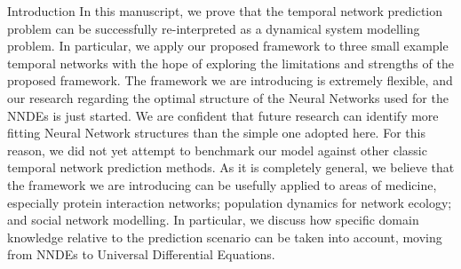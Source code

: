 \documentclass{article}
\begin{document}
\begin{section}{Introduction}
In this manuscript, we prove that the temporal network prediction problem can be successfully re-interpreted as a dynamical system modelling problem. In particular, we apply our proposed framework to three small example temporal networks with the hope of exploring the limitations and strengths of the proposed framework.
The framework we are introducing is extremely flexible, and our research regarding the optimal structure of the Neural Networks used for the NNDEs is just started.
We are confident that future research can identify more fitting Neural Network structures than the simple one adopted here.
For this reason, we did not yet attempt to benchmark our model against other classic temporal network prediction methods.
As it is completely general, we believe that the framework we are introducing can be usefully applied to areas of medicine, especially protein interaction networks; population dynamics for network ecology; and social network modelling. In particular, we discuss how specific domain knowledge relative to the prediction scenario can be taken into account, moving from NNDEs to Universal Differential Equations.

\end{section}
\end{document}
